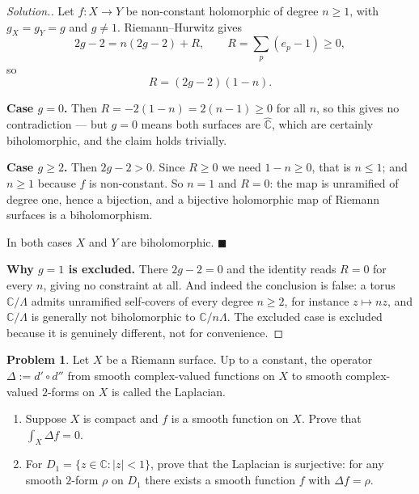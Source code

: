\documentclass[11pt,a4paper]{article}
\theoremstyle{definition}
\newtheorem{problemx}{Problem}[section]
\newenvironment{problem}{\begin{problemx}}{\end{problemx}}
\newenvironment{solution}
  {\renewcommand{\qedsymbol}{}\begin{proof}[\textit{Solution}.]}
  {\end{proof}}
\begin{document}
\begin{solution}
Let $f : X \rightarrow Y$ be non-constant holomorphic of degree $n \geq 1$, with
$g_X = g_Y = g$ and $g \neq 1$. Riemann--Hurwitz gives
$$2g - 2 = n(2g-2) + R,\qquad R = \sum_{p}(e_p-1) \geq 0 ,$$
so
$$R = (2g-2)(1-n).$$

\textbf{Case $g = 0$.} Then $R = -2(1-n) = 2(n-1) \geq 0$ for all $n$, so this
gives no contradiction --- but $g=0$ means both surfaces are $\widehat{\mathbb{C}}$,
which are certainly biholomorphic, and the claim holds trivially.

\textbf{Case $g \geq 2$.} Then $2g-2 > 0$. Since $R \geq 0$ we need
$1 - n \geq 0$, that is $n \leq 1$; and $n \geq 1$ because $f$ is non-constant.
So $n = 1$ and $R = 0$: the map is unramified of degree one, hence a bijection, and
a bijective holomorphic map of Riemann surfaces is a biholomorphism.

In both cases $X$ and $Y$ are biholomorphic. $\blacksquare$

\textbf{Why $g = 1$ is excluded.} There $2g-2 = 0$ and the identity reads $R = 0$
for every $n$, giving no constraint at all. And indeed the conclusion is false:
a torus $\mathbb{C}/\Lambda$ admits unramified self-covers of every degree
$n \geq 2$, for instance $z \mapsto nz$, and $\mathbb{C}/\Lambda$ is generally not
biholomorphic to $\mathbb{C}/n\Lambda$. The excluded case is excluded because it is
genuinely different, not for convenience.
\end{solution}


\begin{problem}
Let $X$ be a Riemann surface. Up to a constant, the operator
$\Delta := d' \circ d''$ from smooth complex-valued functions on $X$ to smooth
complex-valued $2$-forms on $X$ is called the Laplacian.
\begin{enumerate}
\item[(a).] Suppose $X$ is compact and $f$ is a smooth function on $X$. Prove
that $\displaystyle\int_{X}\Delta f = 0$.
\item[(b).] For $D_1 = \{z \in \mathbb{C} : \left|z\right| < 1\}$, prove that the
Laplacian is surjective: for any smooth $2$-form $\rho$ on $D_1$ there exists a
smooth function $f$ with $\Delta f = \rho$.
\end{enumerate}
\end{problem}
\end{document}
